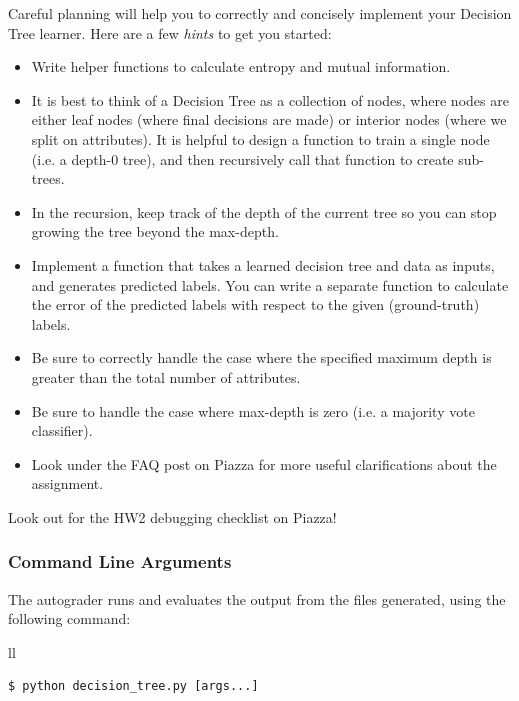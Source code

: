 \documentclass[11pt,addpoints,answers]{exam}
\begin{document}
Careful planning will help you to correctly and concisely implement your Decision Tree learner. Here are a few \emph{hints} to get you started:
\begin{itemize}
    \item Write helper functions to calculate entropy and mutual information.
    \item It is best to think of a Decision Tree as a collection of nodes, where nodes are either leaf nodes (where final decisions are made) or interior nodes (where we split on attributes). It is helpful to design a function to train a single node (i.e. a depth-0 tree), and then recursively call that function to create sub-trees.
    \item In the recursion, keep track of the depth of the current tree so you can stop growing the tree beyond the max-depth.
    \item Implement a function that takes a learned decision tree and data as inputs, and generates predicted labels. You can write a separate function to calculate the error of the predicted labels with respect to the given (ground-truth) labels.
    \item Be sure to correctly handle the case where the specified maximum depth is greater than the total number of attributes.
    \item Be sure to handle the case where max-depth is zero (i.e. a majority vote classifier). 
    \item Look under the FAQ post on Piazza for more useful clarifications about the assignment.
\end{itemize}

\begin{notebox}
Look out for the HW2 debugging checklist on Piazza!
\end{notebox}
\clearpage
\subsubsection{Command Line Arguments}

The autograder runs and evaluates the output from the files  generated, using the following command:

\begin{tabular}{ll}
\begin{lstlisting}[language=Shell]
$ python decision_tree.py [args...]
\end{lstlisting}
\end{tabular}
\end{document}
